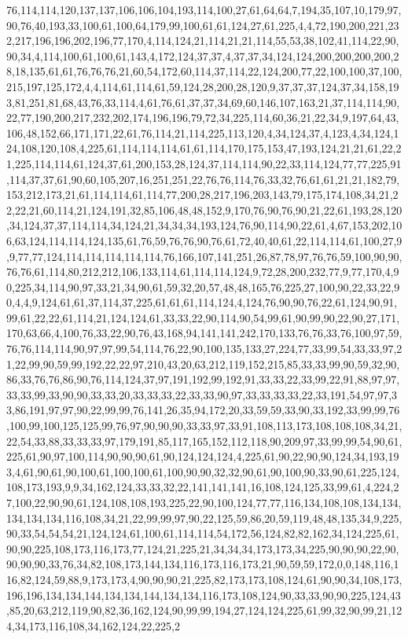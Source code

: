 76,114,114,120,137,137,106,106,104,193,114,100,27,61,64,64,7,194,35,107,10,179,97,90,76,40,193,33,100,61,100,64,179,99,100,61,61,124,27,61,225,4,4,72,190,200,221,232,217,196,196,202,196,77,170,4,114,124,21,114,21,21,114,55,53,38,102,41,114,22,90,90,34,4,114,100,61,100,61,143,4,172,124,37,37,4,37,37,34,124,124,200,200,200,200,28,18,135,61,61,76,76,76,21,60,54,172,60,114,37,114,22,124,200,77,22,100,100,37,100,215,197,125,172,4,4,114,61,114,61,59,124,28,200,28,120,9,37,37,37,124,37,34,158,193,81,251,81,68,43,76,33,114,4,61,76,61,37,37,34,69,60,146,107,163,21,37,114,114,90,22,77,190,200,217,232,202,174,196,196,79,72,34,225,114,60,36,21,22,34,9,197,64,43,106,48,152,66,171,171,22,61,76,114,21,114,225,113,120,4,34,124,37,4,123,4,34,124,124,108,120,108,4,225,61,114,114,114,61,61,114,170,175,153,47,193,124,21,21,61,22,21,225,114,114,61,124,37,61,200,153,28,124,37,114,114,90,22,33,114,124,77,77,225,91,114,37,37,61,90,60,105,207,16,251,251,22,76,76,114,76,33,32,76,61,61,21,21,182,79,153,212,173,21,61,114,114,61,114,77,200,28,217,196,203,143,79,175,174,108,34,21,22,22,21,60,114,21,124,191,32,85,106,48,48,152,9,170,76,90,76,90,21,22,61,193,28,120,34,124,37,37,114,114,34,124,21,34,34,34,193,124,76,90,114,90,22,61,4,67,153,202,106,63,124,114,114,124,135,61,76,59,76,76,90,76,61,72,40,40,61,22,114,114,61,100,27,9,9,77,77,124,114,114,114,114,114,76,166,107,141,251,26,87,78,97,76,76,59,100,90,90,76,76,61,114,80,212,212,106,133,114,61,114,114,124,9,72,28,200,232,77,9,77,170,4,90,225,34,114,90,97,33,21,34,90,61,59,32,20,57,48,48,165,76,225,27,100,90,22,33,22,90,4,4,9,124,61,61,37,114,37,225,61,61,61,114,124,4,124,76,90,90,76,22,61,124,90,91,99,61,22,22,61,114,21,124,124,61,33,33,22,90,114,90,54,99,61,90,99,90,22,90,27,171,170,63,66,4,100,76,33,22,90,76,43,168,94,141,141,242,170,133,76,76,33,76,100,97,59,76,76,114,114,90,97,97,99,54,114,76,22,90,100,135,133,27,224,77,33,99,54,33,33,97,21,22,99,90,59,99,192,22,22,97,210,43,20,63,212,119,152,215,85,33,33,99,90,59,32,90,86,33,76,76,86,90,76,114,124,37,97,191,192,99,192,91,33,33,22,33,99,22,91,88,97,97,33,33,99,33,90,90,33,33,20,33,33,33,22,33,33,90,97,33,33,33,33,22,33,191,54,97,97,33,86,191,97,97,90,22,99,99,76,141,26,35,94,172,20,33,59,59,33,90,33,192,33,99,99,76,100,99,100,125,125,99,76,97,90,90,90,33,33,97,33,91,108,113,173,108,108,108,34,21,22,54,33,88,33,33,33,97,179,191,85,117,165,152,112,118,90,209,97,33,99,99,54,90,61,225,61,90,97,100,114,90,90,90,61,90,124,124,124,4,225,61,90,22,90,90,124,34,193,193,4,61,90,61,90,100,61,100,100,61,100,90,90,32,32,90,61,90,100,90,33,90,61,225,124,108,173,193,9,9,34,162,124,33,33,32,22,141,141,141,16,108,124,125,33,99,61,4,224,27,100,22,90,90,61,124,108,108,193,225,22,90,100,124,77,77,116,134,108,108,134,134,134,134,134,116,108,34,21,22,99,99,97,90,22,125,59,86,20,59,119,48,48,135,34,9,225,90,33,54,54,54,21,124,124,61,100,61,114,114,54,172,56,124,82,82,162,34,124,225,61,90,90,225,108,173,116,173,77,124,21,225,21,34,34,34,173,173,34,225,90,90,90,22,90,90,90,90,33,76,34,82,108,173,144,134,116,173,116,173,21,90,59,59,172,0,0,148,116,116,82,124,59,88,9,173,173,4,90,90,90,21,225,82,173,173,108,124,61,90,90,34,108,173,196,196,134,134,144,134,134,144,134,134,116,173,108,124,90,33,33,90,90,225,124,43,85,20,63,212,119,90,82,36,162,124,90,99,99,194,27,124,124,225,61,99,32,90,99,21,124,34,173,116,108,34,162,124,22,225,2